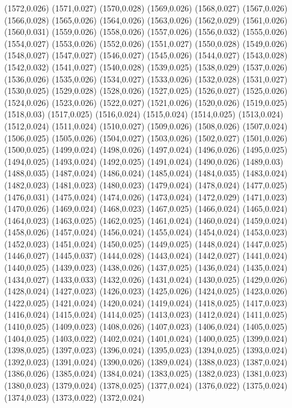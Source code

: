 (1572,0.026)
(1571,0.027)
(1570,0.028)
(1569,0.026)
(1568,0.027)
(1567,0.026)
(1566,0.028)
(1565,0.026)
(1564,0.026)
(1563,0.026)
(1562,0.029)
(1561,0.026)
(1560,0.031)
(1559,0.026)
(1558,0.026)
(1557,0.026)
(1556,0.032)
(1555,0.026)
(1554,0.027)
(1553,0.026)
(1552,0.026)
(1551,0.027)
(1550,0.028)
(1549,0.026)
(1548,0.027)
(1547,0.027)
(1546,0.027)
(1545,0.026)
(1544,0.027)
(1543,0.028)
(1542,0.032)
(1541,0.027)
(1540,0.028)
(1539,0.025)
(1538,0.029)
(1537,0.026)
(1536,0.026)
(1535,0.026)
(1534,0.027)
(1533,0.026)
(1532,0.028)
(1531,0.027)
(1530,0.025)
(1529,0.028)
(1528,0.026)
(1527,0.025)
(1526,0.027)
(1525,0.026)
(1524,0.026)
(1523,0.026)
(1522,0.027)
(1521,0.026)
(1520,0.026)
(1519,0.025)
(1518,0.03)
(1517,0.025)
(1516,0.024)
(1515,0.024)
(1514,0.025)
(1513,0.024)
(1512,0.024)
(1511,0.024)
(1510,0.027)
(1509,0.026)
(1508,0.026)
(1507,0.024)
(1506,0.025)
(1505,0.026)
(1504,0.027)
(1503,0.026)
(1502,0.027)
(1501,0.026)
(1500,0.025)
(1499,0.024)
(1498,0.026)
(1497,0.024)
(1496,0.026)
(1495,0.025)
(1494,0.025)
(1493,0.024)
(1492,0.025)
(1491,0.024)
(1490,0.026)
(1489,0.03)
(1488,0.035)
(1487,0.024)
(1486,0.024)
(1485,0.024)
(1484,0.035)
(1483,0.024)
(1482,0.023)
(1481,0.023)
(1480,0.023)
(1479,0.024)
(1478,0.024)
(1477,0.025)
(1476,0.031)
(1475,0.024)
(1474,0.026)
(1473,0.024)
(1472,0.029)
(1471,0.023)
(1470,0.026)
(1469,0.024)
(1468,0.023)
(1467,0.025)
(1466,0.024)
(1465,0.024)
(1464,0.023)
(1463,0.025)
(1462,0.025)
(1461,0.024)
(1460,0.024)
(1459,0.024)
(1458,0.026)
(1457,0.024)
(1456,0.024)
(1455,0.024)
(1454,0.024)
(1453,0.023)
(1452,0.023)
(1451,0.024)
(1450,0.025)
(1449,0.025)
(1448,0.024)
(1447,0.025)
(1446,0.027)
(1445,0.037)
(1444,0.028)
(1443,0.024)
(1442,0.027)
(1441,0.024)
(1440,0.025)
(1439,0.023)
(1438,0.026)
(1437,0.025)
(1436,0.024)
(1435,0.024)
(1434,0.027)
(1433,0.033)
(1432,0.026)
(1431,0.024)
(1430,0.025)
(1429,0.026)
(1428,0.024)
(1427,0.023)
(1426,0.023)
(1425,0.026)
(1424,0.025)
(1423,0.026)
(1422,0.025)
(1421,0.024)
(1420,0.024)
(1419,0.024)
(1418,0.025)
(1417,0.023)
(1416,0.024)
(1415,0.024)
(1414,0.025)
(1413,0.023)
(1412,0.024)
(1411,0.025)
(1410,0.025)
(1409,0.023)
(1408,0.026)
(1407,0.023)
(1406,0.024)
(1405,0.025)
(1404,0.025)
(1403,0.022)
(1402,0.024)
(1401,0.024)
(1400,0.025)
(1399,0.024)
(1398,0.025)
(1397,0.023)
(1396,0.024)
(1395,0.023)
(1394,0.025)
(1393,0.024)
(1392,0.023)
(1391,0.024)
(1390,0.026)
(1389,0.024)
(1388,0.023)
(1387,0.024)
(1386,0.026)
(1385,0.024)
(1384,0.024)
(1383,0.025)
(1382,0.023)
(1381,0.023)
(1380,0.023)
(1379,0.024)
(1378,0.025)
(1377,0.024)
(1376,0.022)
(1375,0.024)
(1374,0.023)
(1373,0.022)
(1372,0.024)
